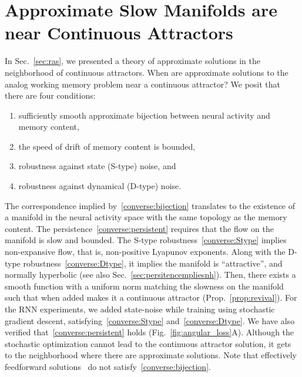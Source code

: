 \documentclass{article} %
\newcounter{ct}
\theoremstyle{definition}
\theoremstyle{remark}
\begin{document}
\section{Approximate Slow Manifolds are near Continuous Attractors}\label{sec:converse}
In Sec.~\ref{sec:ras}, we presented a theory of approximate solutions in the neighborhood of continuous attractors.
When are approximate solutions to the analog working memory problem near a continuous attractor?
We posit that there are four conditions:
\begin{enumerate}[label=\textbf{(C\arabic*)}]
\item sufficiently smooth approximate bijection between neural activity and memory content,\label{converse:bijection}
\item the speed of drift of memory content is bounded,\label{converse:persistent}
\item robustness against state (S-type) noise, and\label{converse:Stype}
\item robustness against dynamical (D-type) noise.\label{converse:Dtype}
\end{enumerate}
The correspondence implied by~\ref{converse:bijection} translates to the existence of a manifold in the neural activity space with the same topology as the memory content.
The persistence~\ref{converse:persistent} requires that the flow on the manifold is slow and bounded.
The S-type robustness~\ref{converse:Stype} implies non-expansive flow, that is, non-positive Lyapunov exponents.
Along with the D-type robustness~\ref{converse:Dtype}, it implies the manifold is ``attractive'', and normally hyperbolic (see also Sec.~\ref{sec:persitencempliesnh}).
Then, there exists a smooth function with a uniform norm matching the slowness on the manifold such that when added makes it a continuous attractor (Prop.~\ref{prop:revival}).
For the RNN experiments, we added state-noise while training using stochastic gradient descent, satisfying~\ref{converse:Stype} and~\ref{converse:Dtype}.
We have also verified that~\ref{converse:persistent} holds (Fig.~\ref{fig:angular_loss}A).
Although the stochastic optimization cannot lead to the continuous attractor solution, it gets to the neighborhood where there are approximate solutions.
Note that effectively feedforward solutions~\citep{Goldman2009} do not satisfy~\ref{converse:bijection}.
\end{document}
